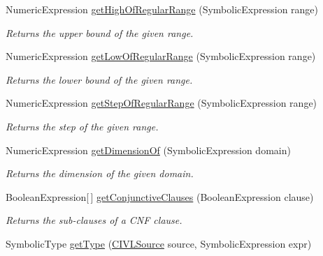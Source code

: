 \begin{DoxyCompactItemize}
Numeric\+Expression \hyperlink{classedu_1_1udel_1_1cis_1_1vsl_1_1civl_1_1dynamic_1_1common_1_1CommonSymbolicUtility_aea7c78d01bb0e24a0d759590cdc6acfc}{get\+High\+Of\+Regular\+Range} (Symbolic\+Expression range)
\begin{DoxyCompactList}\small\item\em Returns the upper bound of the given range. \end{DoxyCompactList}\item 
Numeric\+Expression \hyperlink{classedu_1_1udel_1_1cis_1_1vsl_1_1civl_1_1dynamic_1_1common_1_1CommonSymbolicUtility_a552fefe4a245d99894b09d0611edc7bd}{get\+Low\+Of\+Regular\+Range} (Symbolic\+Expression range)
\begin{DoxyCompactList}\small\item\em Returns the lower bound of the given range. \end{DoxyCompactList}\item 
Numeric\+Expression \hyperlink{classedu_1_1udel_1_1cis_1_1vsl_1_1civl_1_1dynamic_1_1common_1_1CommonSymbolicUtility_ac147f0a82db935e2e0e09f4a63d2dd88}{get\+Step\+Of\+Regular\+Range} (Symbolic\+Expression range)
\begin{DoxyCompactList}\small\item\em Returns the step of the given range. \end{DoxyCompactList}\item 
Numeric\+Expression \hyperlink{classedu_1_1udel_1_1cis_1_1vsl_1_1civl_1_1dynamic_1_1common_1_1CommonSymbolicUtility_af0ebe75a0fc685cb4e156bc5fa16bf67}{get\+Dimension\+Of} (Symbolic\+Expression domain)
\begin{DoxyCompactList}\small\item\em Returns the dimension of the given domain. \end{DoxyCompactList}\item 
Boolean\+Expression\mbox{[}$\,$\mbox{]} \hyperlink{classedu_1_1udel_1_1cis_1_1vsl_1_1civl_1_1dynamic_1_1common_1_1CommonSymbolicUtility_a11c3c01116c48e3f4be40511a08dd621}{get\+Conjunctive\+Clauses} (Boolean\+Expression clause)
\begin{DoxyCompactList}\small\item\em Returns the sub-\/clauses of a C\+N\+F clause. \end{DoxyCompactList}\item 
Symbolic\+Type \hyperlink{classedu_1_1udel_1_1cis_1_1vsl_1_1civl_1_1dynamic_1_1common_1_1CommonSymbolicUtility_ac3d5b649db56bcbd05cafdd94daab526}{get\+Type} (\hyperlink{interfaceedu_1_1udel_1_1cis_1_1vsl_1_1civl_1_1model_1_1IF_1_1CIVLSource}{C\+I\+V\+L\+Source} source, Symbolic\+Expression expr)

\end{DoxyCompactItemize}

